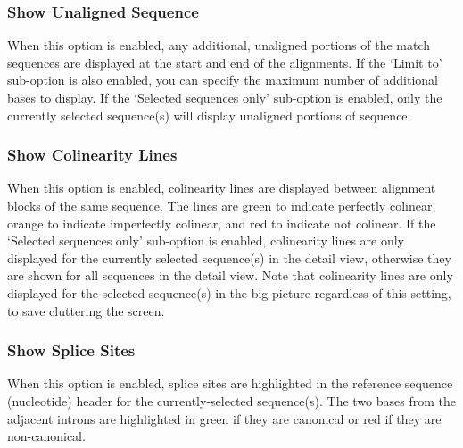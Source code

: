 \documentclass[letterpaper]{article}
\begin{document}
\bigskip

{\color[rgb]{0.30980393,0.5058824,0.7411765}\subsubsection[Show Unaligned Sequence ]{Show Unaligned Sequence }}
\hypertarget{RefHeading2321056909880}{}
When this option is enabled, any additional, unaligned portions of the match sequences are displayed at the start and end of the alignments. If the {\textquoteleft}Limit to{\textquoteright} sub-option is also enabled, you can specify the maximum number of additional bases to display. If the {\textquoteleft}Selected sequences only{\textquoteright} sub-option is enabled, only the currently selected sequence(s) will display unaligned portions of sequence.

\bigskip

{\color[rgb]{0.30980393,0.5058824,0.7411765}\subsubsection[Show Colinearity Lines ]{Show Colinearity Lines }}
\hypertarget{RefHeading2321056909880}{}
When this option is enabled, colinearity lines are displayed between alignment blocks of the same sequence. The lines are green to indicate perfectly colinear, orange to indicate imperfectly colinear, and red to indicate not colinear. If the {\textquoteleft}Selected sequences only{\textquoteright} sub-option is enabled, colinearity lines are only displayed for the currently selected sequence(s) in the detail view, otherwise they are shown for all sequences in the detail view. Note that colinearity lines are only displayed for the selected sequence(s) in the big picture regardless of this setting, to save cluttering the screen.

\bigskip

{\color[rgb]{0.30980393,0.5058824,0.7411765}\subsubsection[Show Splice Sites]{Show Splice Sites}}
\hypertarget{RefHeading2341056909880}{}
When this option is enabled, splice sites are highlighted in the reference sequence (nucleotide) header for the currently-selected sequence(s). The two bases from the adjacent introns are highlighted in green if they are canonical or red if they are non-canonical.

\bigskip
\end{document}

